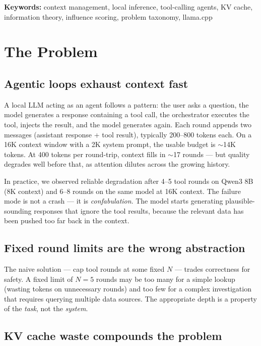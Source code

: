 \documentclass[11pt,a4paper]{article}
\begin{document}
\vspace{1em}
\noindent\textbf{Keywords:} context management, local inference, tool-calling agents, KV cache, information theory, influence scoring, problem taxonomy, llama.cpp

\section{The Problem}

\subsection{Agentic loops exhaust context fast}

A local LLM acting as an agent follows a pattern: the user asks a question, the model generates a response containing a tool call, the orchestrator executes the tool, injects the result, and the model generates again. Each round appends two messages (assistant response + tool result), typically 200--800 tokens each. On a 16K context window with a 2K system prompt, the usable budget is $\sim$14K tokens. At 400 tokens per round-trip, context fills in $\sim$17 rounds --- but quality degrades well before that, as attention dilutes across the growing history.

In practice, we observed reliable degradation after 4--5 tool rounds on Qwen3 8B (8K context) and 6--8 rounds on the same model at 16K context. The failure mode is not a crash --- it is \emph{confabulation}. The model starts generating plausible-sounding responses that ignore the tool results, because the relevant data has been pushed too far back in the context.

\subsection{Fixed round limits are the wrong abstraction}

The naive solution --- cap tool rounds at some fixed $N$ --- trades correctness for safety. A fixed limit of $N=5$ rounds may be too many for a simple lookup (wasting tokens on unnecessary rounds) and too few for a complex investigation that requires querying multiple data sources. The appropriate depth is a property of the \emph{task}, not the \emph{system}.

\subsection{KV cache waste compounds the problem}
\end{document}
